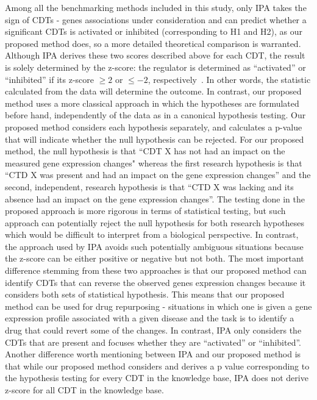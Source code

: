 Among all the benchmarking methods included in this study, only IPA takes the sign of CDTs - genes associations under consideration and can predict whether a significant CDTs is activated or inhibited (corresponding to H1 and H2), as our proposed method does, so a more detailed theoretical comparison is warranted.
Although IPA derives these two scores  described above for each CDT, the result is solely determined by the z-score: the regulator is determined as ``activated''  or ``inhibited'' if its z-score $\geq 2$ or $\leq -2$, respectively~\cite{kramer2013causal}. In other words, the statistic calculated from the data will determine the outcome. In contrast, our proposed method uses a more classical approach in which the hypotheses are formulated before hand, independently of the data as in a canonical hypothesis testing. Our proposed method  considers each hypothesis separately, and calculates a p-value that will indicate whether the null hypothesis can be rejected. 
For our proposed method, the null hypothesis is that ``CDT X has not had an impact on the measured gene expression changes" whereas the first research hypothesis is that ``CTD X was present and had an impact on the gene expression changes'' and the second, independent, research hypothesis is that ``CTD X was lacking and its absence had an impact on the gene expression changes''. 
The testing done in the proposed approach is more rigorous in terms of statistical testing, but such approach can potentially reject the null hypothesis for both research hypotheses which would be difficult to interpret from a biological perspective. In contrast, the approach used by IPA avoids such potentially ambiguous situations because the z-score can be either positive or negative but not both. The most important difference stemming from these two approaches is that our proposed method  can identify CDTs that can reverse the observed genes expression changes because it considers both sets of statistical hypothesis. This means that our proposed method can be used for drug repurposing - situations in which one is given a   gene expression profile associated with a given disease and the task is to identify a drug that could revert some of the changes. In contrast, IPA only considers the CDTs that are present and focuses whether they are ``activated'' or ``inhibited''. 
Another  difference worth mentioning between IPA and our proposed method  is that while our proposed method  considers and derives a p value corresponding to the hypothesis testing for every CDT in the knowledge base, IPA does not derive z-score for all CDT in the knowledge base. %

